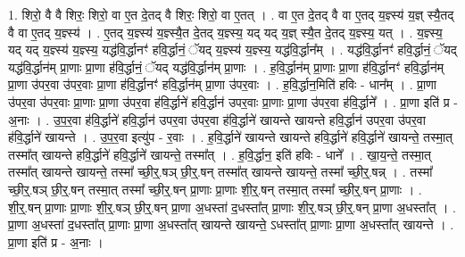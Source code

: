 \documentclass[17pt]{extarticle}
\begin{document}
1. शिरो॒ वै वै शिरः॒ शिरो॒ वा ए॒त दे॒तद् वै शिरः॒ शिरो॒ वा ए॒तत् । . वा ए॒त दे॒तद् वै वा ए॒तद् य॒ज्ञ्स्य॑ य॒ज्ञ् स्यै॒तद् वै वा ए॒तद् य॒ज्ञ्स्य॑ । . ए॒तद् य॒ज्ञ्स्य॑ य॒ज्ञ्स्यै॒त दे॒तद् य॒ज्ञ्स्य॒ यद् यद् य॒ज्ञ् स्यै॒त दे॒तद् य॒ज्ञ्स्य॒ यत् । . य॒ज्ञ्स्य॒ यद् यद् य॒ज्ञ्स्य॑ य॒ज्ञ्स्य॒ यद्ध॑वि॒र्द्धानꣳ॑ हवि॒र्द्धानं॒ ॅयद् य॒ज्ञ्स्य॑ य॒ज्ञ्स्य॒ यद्ध॑वि॒र्द्धान᳚म् । . यद्ध॑वि॒र्द्धानꣳ॑ हवि॒र्द्धानं॒ ॅयद् यद्ध॑वि॒र्द्धान॑म् प्रा॒णाः प्रा॒णा ह॑वि॒र्द्धानं॒ ॅयद् यद्ध॑वि॒र्द्धान॑म् प्रा॒णाः । . ह॒वि॒र्द्धान॑म् प्रा॒णाः प्रा॒णा ह॑वि॒र्द्धानꣳ॑ हवि॒र्द्धान॑म् प्रा॒णा उ॑पर॒वा उ॑पर॒वाः प्रा॒णा ह॑वि॒र्द्धानꣳ॑ हवि॒र्द्धान॑म् प्रा॒णा उ॑पर॒वाः । . ह॒वि॒र्द्धान॒मिति॑ हविः - धान᳚म् । . प्रा॒णा उ॑पर॒वा उ॑पर॒वाः प्रा॒णाः प्रा॒णा उ॑पर॒वा ह॑वि॒र्द्धाने॑ हवि॒र्द्धान॑ उपर॒वाः प्रा॒णाः प्रा॒णा उ॑पर॒वा ह॑वि॒र्द्धाने᳚ । . प्रा॒णा इति॑ प्र - अ॒नाः । . उ॒प॒र॒वा ह॑वि॒र्द्धाने॑ हवि॒र्द्धान॑ उपर॒वा उ॑पर॒वा ह॑वि॒र्द्धाने॑ खायन्ते खायन्ते हवि॒र्द्धान॑ उपर॒वा उ॑पर॒वा ह॑वि॒र्द्धाने॑ खायन्ते । . उ॒प॒र॒वा इत्यु॑प - र॒वाः । . ह॒वि॒र्द्धाने॑ खायन्ते खायन्ते हवि॒र्द्धाने॑ हवि॒र्द्धाने॑ खायन्ते॒ तस्मा॒त् तस्मा᳚त् खायन्ते हवि॒र्द्धाने॑ हवि॒र्द्धाने॑ खायन्ते॒ तस्मा᳚त् । . ह॒वि॒र्द्धान॒ इति॑ हविः - धाने᳚ । . खा॒य॒न्ते॒ तस्मा॒त् तस्मा᳚त् खायन्ते खायन्ते॒ तस्मा᳚ च्छी॒र्॒.षञ् छी॒र्॒.षन् तस्मा᳚त् खायन्ते खायन्ते॒ तस्मा᳚
च्छी॒र्॒.षन्न् । . तस्मा᳚ च्छी॒र्॒.षञ् छी॒र्॒.षन् तस्मा॒त् तस्मा᳚ च्छी॒र्॒.षन् प्रा॒णाः प्रा॒णाः शी॒र्॒.षन् तस्मा॒त् तस्मा᳚ च्छी॒र्॒.षन् प्रा॒णाः । . शी॒र्॒.षन् प्रा॒णाः प्रा॒णाः शी॒र्॒.षञ् छी॒र्॒.षन् प्रा॒णा अ॒धस्ता॑ द॒धस्ता᳚त् प्रा॒णाः शी॒र्॒.षञ् छी॒र्॒.षन् प्रा॒णा अ॒धस्ता᳚त् । . प्रा॒णा अ॒धस्ता॑ द॒धस्ता᳚त् प्रा॒णाः प्रा॒णा अ॒धस्ता᳚त् खायन्ते खायन्ते॒ ऽधस्ता᳚त् प्रा॒णाः प्रा॒णा अ॒धस्ता᳚त् खायन्ते । . प्रा॒णा इति॑ प्र - अ॒नाः । \newline
\end{document}
